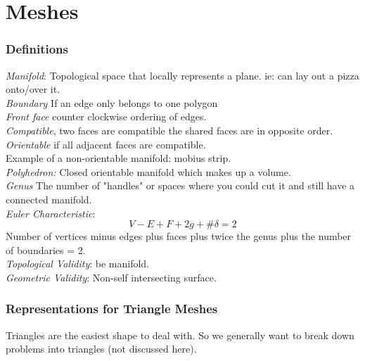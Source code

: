 \documentclass[12pt]{article}
\theoremstyle{definition}
\begin{document}
\part{Meshes}
\section{Definitions}
\textit{Manifold}: Topological space that locally represents a plane. ie: can lay out a pizza onto/over it.
\\ \linebreak
\textit{Boundary} If an edge only belongs to one polygon\\ \linebreak
\textit{Front face} counter clockwise ordering of edges.\\ \linebreak
\textit{Compatible}, two faces are compatible the shared faces are in opposite order.\\ \linebreak
\textit{Orientable} if all adjacent faces are compatible.
\\ \linebreak
Example of a non-orientable manifold: mobius strip.
\\ \linebreak
\textit{Polyhedron:} Closed orientable manifold which makes up a volume.
\\ \linebreak
\textit{Genus} The number of "handles" or spaces where you could cut it and still have a connected manifold.\\ \linebreak
\textit{Euler Characteristic}: 
$$ V - E + F + 2g + \#\delta = 2$$
Number of vertices minus edges plus faces plus twice the genus plus the number of boundaries = 2.
\\ \linebreak
\textit{Topological Validity}: be manifold.
\\ \linebreak
\textit{Geometric Validity}: Non-self intersecting surface.\\ \linebreak

\section{Representations for Triangle Meshes}
Triangles are the easiest shape to deal with. So we generally want to break down problems into triangles (not discussed here).
\\ \linebreak
\end{document}
